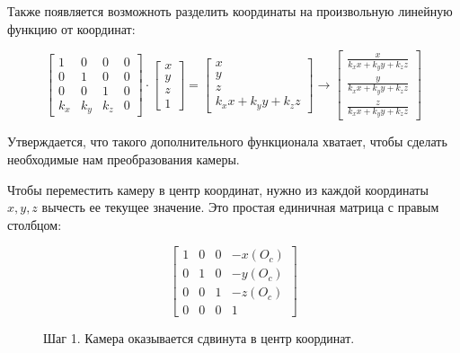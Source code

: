 \documentclass{article}
\begin{document}
Также появляется возможноть разделить координаты на произвольную линейную функцию от координат:

$$\begin{bmatrix} 1 & 0 & 0 & 0 \\ 0 & 1 & 0 & 0 \\ 0 & 0 & 1 & 0 \\ k_x & k_y & k_z & 0\end{bmatrix} \cdot\begin{bmatrix} x \\ y \\ z \\ 1 \end{bmatrix} = \begin{bmatrix} x \\ y \\ z \\ k_xx + k_yy + k_zz\end{bmatrix} \to \begin{bmatrix}\frac{x}{k_xx + k_yy + k_zz} \\\frac{y}{k_xx + k_yy + k_zz} \\\frac{z}{k_xx + k_yy + k_zz} \end{bmatrix}$$

Утверждается, что такого дополнительного функционала хватает, чтобы сделать необходимые нам преобразования камеры.

	
Чтобы переместить камеру в центр координат, нужно из каждой координаты $x, y, z$ вычесть ее текущее значение. Это простая единичная матрица с правым столбцом:

$$
\begin{bmatrix}
1 & 0 & 0 & -x(O_c) \\
0 & 1 & 0 & -y(O_c) \\
0 & 0 & 1 & -z(O_c) \\
0 & 0 & 0 & 1
\end{bmatrix}
$$

\begin{center}
\begin{figure}[H]
\caption{Шаг 1. Камера оказывается сдвинута в центр координат.}
\label{ris:image}
\end{figure}
\end{center}
\end{document}
